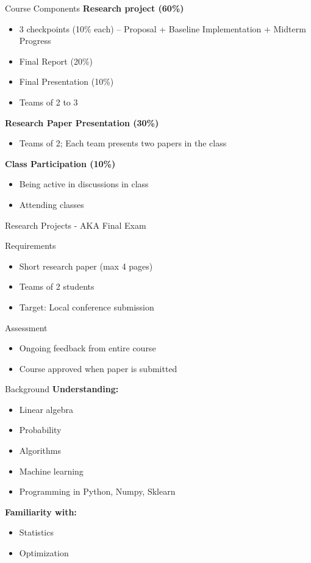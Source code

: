 \documentclass[10pt,aspectratio=169]{beamer}
\begin{document}
\begin{frame}{Course Components}
\textbf{Research project (60\%)}
\begin{itemize}
\item 3 checkpoints (10\% each) – Proposal + Baseline Implementation + Midterm Progress
\item Final Report (20\%)
\item Final Presentation (10\%)
\item Teams of 2 to 3
\end{itemize}

\textbf{Research Paper Presentation (30\%)}
\begin{itemize}
\item Teams of 2; Each team presents two papers in the class
\end{itemize}

\textbf{Class Participation (10\%)}
\begin{itemize}
\item Being active in discussions in class
\item Attending classes
\end{itemize}
\end{frame}

\begin{frame}{Research Projects - AKA Final Exam}
\begin{block}{Requirements}
\begin{itemize}
\item Short research paper (max 4 pages)
\item Teams of 2 students
\item Target: Local conference submission
\end{itemize}
\end{block}

\begin{block}{Assessment}
\begin{itemize}
\item Ongoing feedback from entire course
\item Course approved when paper is submitted
\end{itemize}
\end{block}
\end{frame}

\begin{frame}{Background}
\textbf{Understanding:}
\begin{itemize}
\item Linear algebra
\item Probability
\item Algorithms
\item Machine learning
\item Programming in Python, Numpy, Sklearn
\end{itemize}

\textbf{Familiarity with:}
\begin{itemize}
\item Statistics
\item Optimization
\end{itemize}
\end{frame}
\end{document}
